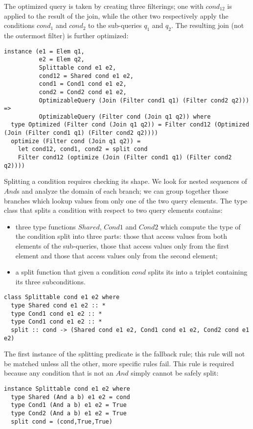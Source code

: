 The optimized query is taken by creating three filterings; one with $cond_{12}$ is applied to the result of the join, while the other two respectively apply the conditions $cond_1$ and $cond_2$ to the sub-queries $q_1$ and $q_2$. The resulting join (not the outermost filter) is further optimized:
\begin{lstlisting}
instance (e1 = Elem q1,
          e2 = Elem q2,
          Splittable cond e1 e2, 
          cond12 = Shared cond e1 e2,
          cond1 = Cond1 cond e1 e2,
          cond2 = Cond2 cond e1 e2,
          OptimizableQuery (Join (Filter cond1 q1) (Filter cond2 q2))) =>
          OptimizableQuery (Filter cond (Join q1 q2)) where
  type Optimized (Filter cond (Join q1 q2)) = Filter cond12 (Optimized (Join (Filter cond1 q1) (Filter cond2 q2)))) 
  optimize (Filter cond (Join q1 q2)) =
    let cond12, cond1, cond2 = split cond
    Filter cond12 (optimize (Join (Filter cond1 q1) (Filter cond2 q2)))) 
\end{lstlisting}

Splitting a condition requires checking its shape. We look for nested sequences of $And$s and analyze the domain of each branch; we can group together those branches which lookup values from only one of the two query elements. The type class that splits a condition with respect to two query elements contains:
\begin{itemize}
\item three type functions $Shared$, $Cond1$ and $Cond2$ which compute the type of the condition split into three parts: those that access values from both elements of the sub-queries, those that access values only from the first element and those that access values only from the second element;
\item a split function that given a condition $cond$ splits its into a triplet containing its three subconditions.
\end{itemize}
\begin{lstlisting}
class Splittable cond e1 e2 where
  type Shared cond e1 e2 :: *
  type Cond1 cond e1 e2 :: *
  type Cond1 cond e1 e2 :: *
  split :: cond -> (Shared cond e1 e2, Cond1 cond e1 e2, Cond2 cond e1 e2)
\end{lstlisting}

The first instance of the splitting predicate is the fallback rule; this rule will not be matched unless all the other, more specific rules fail. This rule is required because any condition that is not an $And$ simply cannot be safely split:
\begin{lstlisting}
instance Splittable cond e1 e2 where
  type Shared (And a b) e1 e2 = cond
  type Cond1 (And a b) e1 e2 = True
  type Cond2 (And a b) e1 e2 = True
  split cond = (cond,True,True)
\end{lstlisting}

